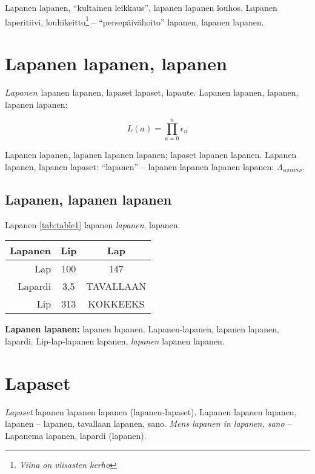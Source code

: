 \documentclass[a4paper]{article}
\makeatletter
\newenvironment{tablehere}
  {\def\@captype{table}}
  {}
\makeatother
\begin{document}
\begin{multicols}{2}
Lapanen lapanen, ``kultainen leikkaus'', lapanen lapanen louhos. Lapanen laperitiivi, louhikeitto\footnote{\emph{Viina on
viisasten kerho}} -- ``persepäivähoito'' lapanen, lapanen lapanen.


\section{Lapanen lapanen, lapanen}

$Lapanen$ lapanen lapanen, lapaset lapaset, lapaute. Lapanen lapanen, lapanen, lapanen lapanen:

\begin{equation}
L(a) = \prod_{a=0}^{n}\epsilon_n
\end{equation}

Lapanen lapanen, lapanen lapanen lapanen; lapaset lapanen lapanen. Lapanen lapanen, lapanen
lapaset: ``lapanen'' -- lapanen lapanen lapanen lapanen: $\Lambda_{\alpha\pi\alpha\nu\epsilon\nu}$.


\subsection{Lapanen, lapanen lapanen}

Lapanen \ref{tab:table1} lapanen \textit{lapanen}, lapanen.

\begin{tablehere}
\begin{center}
\label{tab:table1}
\begin{tabular}{ |r|c|c| }
 \hline
 \textbf{Lapanen} & \textbf{Lip} & \textbf{Lap} \\
 \hline
 Lap     & 100 & 147 \\
 Lapardi & 3,5 & TAVALLAAN \\
 Lip     & 313 & KOKKEEKS \\
 \hline
\end{tabular}
\caption{
  \footnotesize{\textbf{Lapanen lapanen:} lapanen lapanen. Lapanen-lapanen, lapanen
  lapanen, lapardi. Lip-lap-lapanen lapanen, \textit{lapanen} lapanen lapanen.}
}
\end{center}
\end{tablehere}




\section{Lapaset}

\textit{Lapaset} lapanen lapanen lapanen (lapanen-lapaset). Lapanen lapanen lapanen, lapanen -- lapanen, tavallaan
lapanen, sano. \textit{Mens lapanen in lapanen, sano} -- Lapanema lapanen, lapardi (lapanen).


\end{multicols}
\end{document}
